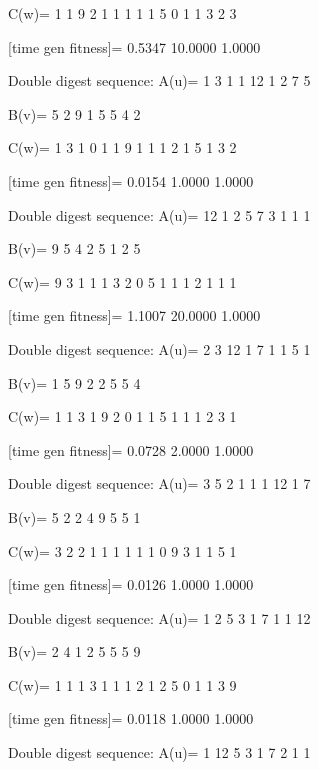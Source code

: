 C(w)=
     1     1     9     2     1     1     1     1     1     5     0     1     1     3     2     3

[time gen fitness]=
    0.5347   10.0000    1.0000

Double digest sequence:
A(u)=
     1     3     1     1    12     1     2     7     5

B(v)=
     5     2     9     1     5     5     4     2

C(w)=
     1     3     1     0     1     1     9     1     1     1     2     1     5     1     3     2

[time gen fitness]=
    0.0154    1.0000    1.0000

Double digest sequence:
A(u)=
    12     1     2     5     7     3     1     1     1

B(v)=
     9     5     4     2     5     1     2     5

C(w)=
     9     3     1     1     1     3     2     0     5     1     1     1     2     1     1     1

[time gen fitness]=
    1.1007   20.0000    1.0000

Double digest sequence:
A(u)=
     2     3    12     1     7     1     1     5     1

B(v)=
     1     5     9     2     2     5     5     4

C(w)=
     1     1     3     1     9     2     0     1     1     5     1     1     1     2     3     1

[time gen fitness]=
    0.0728    2.0000    1.0000

Double digest sequence:
A(u)=
     3     5     2     1     1     1    12     1     7

B(v)=
     5     2     2     4     9     5     5     1

C(w)=
     3     2     2     1     1     1     1     1     1     0     9     3     1     1     5     1

[time gen fitness]=
    0.0126    1.0000    1.0000

Double digest sequence:
A(u)=
     1     2     5     3     1     7     1     1    12

B(v)=
     2     4     1     2     5     5     5     9

C(w)=
     1     1     1     3     1     1     1     2     1     2     5     0     1     1     3     9

[time gen fitness]=
    0.0118    1.0000    1.0000

Double digest sequence:
A(u)=
     1    12     5     3     1     7     2     1     1

